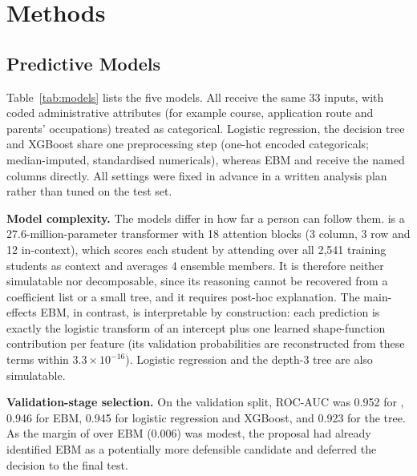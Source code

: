 \section{Methods}
\label{sec:methods}

\subsection{Predictive Models}

Table~\ref{tab:models} lists the five models. All receive the same 33 inputs, with coded
administrative attributes (for example course, application route and parents' occupations) treated
as categorical. Logistic regression, the decision tree and XGBoost share one preprocessing step
(one-hot encoded categoricals; median-imputed, standardised numericals), whereas EBM and \tabicl
receive the named columns directly. All settings were fixed in advance in a written analysis plan
rather than tuned on the test set.

\textbf{Model complexity.} The models differ in how far a person can follow them. \tabicl is a
27.6-million-parameter transformer with 18 attention blocks (3 column, 3 row and 12 in-context),
which scores each student by attending over all 2,541 training students as context and averages 4
ensemble members. It is therefore neither simulatable nor decomposable, since its reasoning cannot be
recovered from a coefficient list or a small tree, and it requires post-hoc explanation. The main-effects EBM, in contrast, is
interpretable by construction: each prediction is exactly the logistic transform of an intercept
plus one learned shape-function contribution per feature (its validation probabilities are
reconstructed from these terms within $3.3\times10^{-16}$). Logistic regression and the depth-3 tree
are also simulatable.

\textbf{Validation-stage selection.} On the validation split, ROC-AUC was 0.952 for \tabicl, 0.946
for EBM, 0.945 for logistic regression and XGBoost, and 0.923 for the tree. As the margin of \tabicl
over EBM (0.006) was modest, the proposal had already identified EBM as a potentially more
defensible candidate and deferred the decision to the final test.

